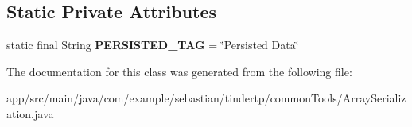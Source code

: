 \subsection*{Static Private Attributes}
\begin{DoxyCompactItemize}
\item 
static final String {\bfseries P\+E\+R\+S\+I\+S\+T\+E\+D\+\_\+\+T\+AG} = \char`\"{}Persisted Data\char`\"{}\hypertarget{classcom_1_1example_1_1sebastian_1_1tindertp_1_1commonTools_1_1ArraySerialization_ac97509cc0f256f877558c94a3c690ea5}{}\label{classcom_1_1example_1_1sebastian_1_1tindertp_1_1commonTools_1_1ArraySerialization_ac97509cc0f256f877558c94a3c690ea5}

\end{DoxyCompactItemize}


The documentation for this class was generated from the following file\+:\begin{DoxyCompactItemize}
\item 
app/src/main/java/com/example/sebastian/tindertp/common\+Tools/Array\+Serialization.\+java\end{DoxyCompactItemize}

